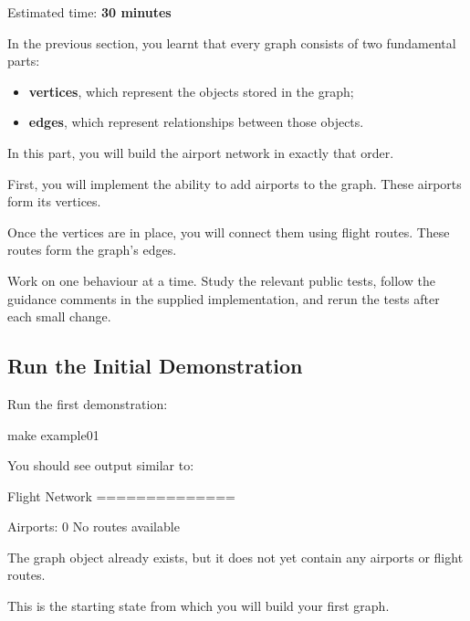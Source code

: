 \documentclass{csc2059practical}
\begin{document}
\begin{infobox}
Estimated time: \textbf{30 minutes}
\end{infobox}

In the previous section, you learnt that every graph consists of two fundamental
parts:

\begin{itemize}
\item \textbf{vertices}, which represent the objects stored in the graph;
\item \textbf{edges}, which represent relationships between those objects.
\end{itemize}

In this part, you will build the airport network in exactly that order.

First, you will implement the ability to add airports to the graph. These
airports form its vertices.

Once the vertices are in place, you will connect them using flight routes. These
routes form the graph’s edges.

Work on one behaviour at a time. Study the relevant public tests, follow the
guidance comments in the supplied implementation, and rerun the tests after each
small change.


\subsection{Run the Initial Demonstration}

Run the first demonstration:

\begin{terminal}
make example01
\end{terminal}

You should see output similar to:

\begin{terminal}
Flight Network
==============

Airports: 0
No routes available

\end{terminal}

The graph object already exists, but it does not yet contain any airports or
flight routes.

This is the starting state from which you will build your first graph.
\end{document}
